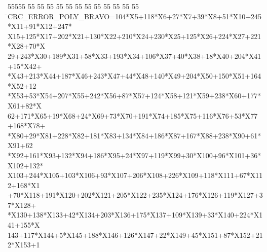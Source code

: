 %
%
\begin{tabbing}
55555 \= 55 \= 55 \= 55 \= 55 \= 55 \= 55 \= 55 \= 55 \= 55 \= 55 \= 55 \= 55 \= \>CRC\_ERROR\_POLY\_BRAVO=104*X5+118*X6+27*X7+39*X8+51*X10+245*X11+91*X12+247*\\[0pt]
\>X15+125*X17+202*X21+130*X22+210*X24+230*X25+125*X26+224*X27+221*X28+70*X\\[0pt]
\>29+243*X30+189*X31+58*X33+193*X34+106*X37+40*X38+18*X40+204*X41+15*X42+\\[0pt]
*X43+213*X44+187*X46+243*X47+44*X48+140*X49+204*X50+150*X51+164*X52+12\\[0pt]
*X53+53*X54+207*X55+242*X56+87*X57+124*X58+121*X59+238*X60+177*X61+82*X\\[0pt]
\>62+171*X65+19*X68+24*X69+73*X70+191*X74+185*X75+116*X76+53*X77+168*X78+\\[0pt]
*X80+29*X81+228*X82+181*X83+134*X84+186*X87+167*X88+238*X90+61*X91+62\\[0pt]
\>*X92+161*X93+132*X94+186*X95+24*X97+119*X99+30*X100+96*X101+36*X102+132*\\[0pt]
\>X103+244*X105+103*X106+93*X107+206*X108+226*X109+118*X111+67*X112+168*X1\\[0pt]
+70*X118+191*X120+202*X121+205*X122+235*X124+176*X126+119*X127+37*X128+\\[0pt]
*X130+138*X133+42*X134+203*X136+175*X137+109*X139+33*X140+224*X141+155*X\\[0pt]
\>143+117*X144+5*X145+188*X146+126*X147+22*X149+45*X151+87*X152+212*X153+1\\[0pt]

\end{tabbing}
